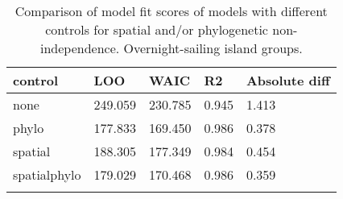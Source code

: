 \begin{longtable}{p{2cm}p{2cm}p{2cm}p{2cm}p{2cm}}
  \toprule
control & LOO & WAIC & R2 & Absolute diff \\ 
  \midrule
none & 249.059 & 230.785 & 0.945 & 1.413 \\ 
  phylo & 177.833 & 169.450 & 0.986 & 0.378 \\ 
  spatial & 188.305 & 177.349 & 0.984 & 0.454 \\ 
  spatialphylo & 179.029 & 170.468 & 0.986 & 0.359 \\ 
   \bottomrule
\caption{Comparison of model fit scores of models with different controls for spatial and/or phylogenetic non-independence. Overnight-sailing island groups.} 
\label{model_fit_score_table_SBZR}
\end{longtable}
